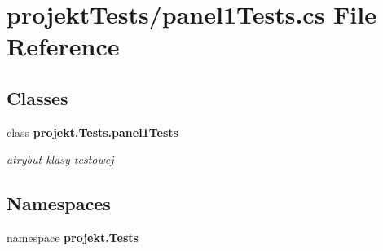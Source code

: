 \section{projekt\+Tests/panel1\+Tests.cs File Reference}
\label{panel1Tests_8cs}
\subsection*{Classes}
\begin{DoxyCompactItemize}
\item 
class \textbf{ projekt.\+Tests.\+panel1\+Tests}
\begin{DoxyCompactList}\small\item\em atrybut klasy testowej \end{DoxyCompactList}\end{DoxyCompactItemize}
\subsection*{Namespaces}
\begin{DoxyCompactItemize}
\item 
namespace \textbf{ projekt.\+Tests}
\end{DoxyCompactItemize}

